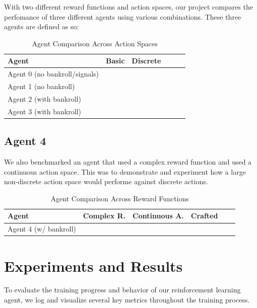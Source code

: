 \documentclass[sigconf]{acmart}
\newcommand{\cmark}{\ding{51}}
\begin{document}
With two different reward functions and action spaces, our project compares the perfomance of three different agents using various combinations. These three agents are defined as so: 


\begin{table}[h]
  \caption{Agent Comparison Across Action Spaces}
  \label{tab:agent_benchmarks}
  \begin{tabular}{lccccc}
    \toprule
    \textbf{Agent} & \textbf{Basic} & \textbf{Discrete} \\
    \midrule
    Agent 0 (no bankroll/signals)     & \cmark  &         \\
    Agent 1 (no bankroll)               & \cmark  &         \\
    Agent 2 (with bankroll)             & \cmark  &         \\
    Agent 3 (with bankroll)             &         & \cmark  \\
    \bottomrule
  \end{tabular}
\end{table}

\subsection{Agent 4}

We also benchmarked an agent that used a complex reward function and used a continuous action space. This was to demonstrate and experiment how a large non-discrete action space would performe against discrete actions.

\begin{table}[h]
  \caption{Agent Comparison Across Reward Functions}
  \label{tab:agent_benchmarks}
  \begin{tabular}{lccccc}
    \toprule
    \textbf{Agent} & \textbf{Complex R.} & \textbf{Continuous A.} & \textbf{Crafted} \\
    \midrule
    Agent 4 (w/ bankroll)   & \cmark        & \cmark & \cmark\\
    \bottomrule
  \end{tabular}
\end{table}

\bigskip
\section{Experiments and Results}

To evaluate the training progress and behavior of our reinforcement learning agent, we log and visualize several key metrics throughout the training process.
\end{document}
